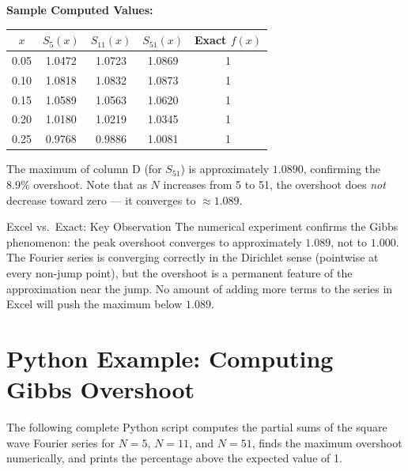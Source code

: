 \documentclass[12pt,a4paper]{article}
\begin{document}
\medskip
\textbf{Sample Computed Values:}

\begin{center}
\begin{tabular}{@{}ccccc@{}}
\toprule
$x$ & $S_5(x)$ & $S_{11}(x)$ & $S_{51}(x)$ & Exact $f(x)$ \\
\midrule
0.05 & 1.0472 & 1.0723 & 1.0869 & 1 \\
0.10 & 1.0818 & 1.0832 & 1.0873 & 1 \\
0.15 & 1.0589 & 1.0563 & 1.0620 & 1 \\
0.20 & 1.0180 & 1.0219 & 1.0345 & 1 \\
0.25 & 0.9768 & 0.9886 & 1.0081 & 1 \\
\bottomrule
\end{tabular}
\end{center}

The maximum of column D (for $S_{51}$) is approximately $1.0890$, confirming the $8.9\%$ overshoot. Note that as $N$ increases from 5 to 51, the overshoot does \emph{not} decrease toward zero --- it converges to $\approx 1.089$.

\begin{learnbox}{Excel vs.\ Exact: Key Observation}
The numerical experiment confirms the Gibbs phenomenon: the peak overshoot converges to approximately $1.089$, not to $1.000$. The Fourier series is converging correctly in the Dirichlet sense (pointwise at every non-jump point), but the overshoot is a permanent feature of the approximation near the jump. No amount of adding more terms to the series in Excel will push the maximum below $1.089$.
\end{learnbox}

\section{Python Example: Computing Gibbs Overshoot}

The following complete Python script computes the partial sums of the square wave Fourier series for $N=5$, $N=11$, and $N=51$, finds the maximum overshoot numerically, and prints the percentage above the expected value of 1.
\end{document}
